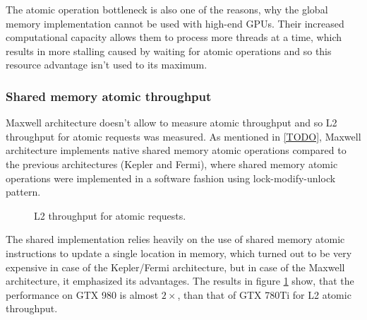 The atomic operation bottleneck is also one of the reasons, why the global memory implementation cannot be used with high-end GPUs. Their increased computational capacity allows them to process more threads at a time, which results in more stalling caused by waiting for atomic operations and so this resource advantage isn't used to its maximum.

\subsubsection{Shared memory atomic throughput}\label{subsubsec:prof-thr-shared-memory}

Maxwell architecture doesn't allow to measure atomic throughput and so L2 throughput for atomic requests was measured. As mentioned in \ref{TODO}, Maxwell architecture implements native shared memory atomic operations compared to the previous architectures (Kepler and Fermi), where shared memory atomic operations were implemented in a software fashion using lock-modify-unlock pattern.

\begin{figure}[ht]
\centering{}
	\caption{L2 throughput for atomic requests.}
		\label{fig:l2-atomic-shared}
\end{figure}

The shared implementation relies heavily on the use of shared memory atomic instructions to update a single location in memory, which turned out to be very expensive in case of the Kepler/Fermi architecture, but in case of the Maxwell architecture, it emphasized its advantages. The results in figure \ref{fig:l2-atomic-shared} show, that the performance on GTX 980 is almost $2\times$, than that of GTX 780Ti for L2 atomic throughput.

